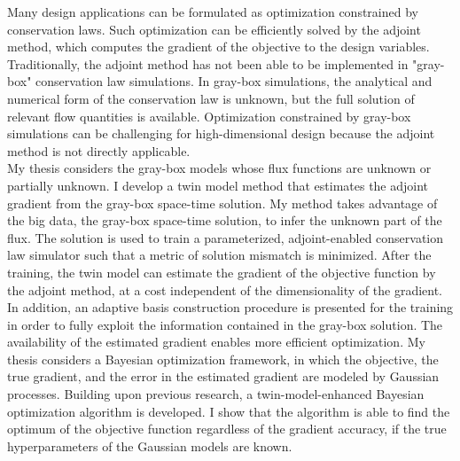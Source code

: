% 
% 
%


Many design applications can be formulated as optimization constrained by conservation laws. Such optimization can be efficiently solved by the adjoint method, which computes the gradient of the objective to the design variables. Traditionally, the adjoint method has not been able to be implemented in "gray-box" conservation law simulations. In gray-box simulations, the analytical and numerical form of the conservation law is unknown, but the full solution of relevant flow quantities is available. Optimization constrained by gray-box simulations can be challenging for high-dimensional design because the adjoint method is not directly applicable.\\


My thesis considers the gray-box models whose flux functions are unknown or partially unknown. 
I develop a twin model method that estimates the adjoint gradient from the gray-box space-time
solution. My method takes advantage of the big data, the gray-box space-time solution, to
infer the unknown part of the flux.
The solution is used to train a parameterized, adjoint-enabled conservation law simulator such that
a metric of solution mismatch is minimized.
After the training,
the twin model can estimate the gradient of the objective function by the adjoint method,
at a cost independent of the dimensionality of the gradient. 
In addition, an adaptive basis construction
procedure is presented for the training in order to fully exploit the information contained in the 
gray-box solution.
The availability of the estimated gradient enables more efficient optimization. My thesis 
considers a Bayesian optimization framework, in which 
the objective, the true gradient, and the error in the estimated gradient are 
modeled by Gaussian processes. 
Building upon previous research, a twin-model-enhanced Bayesian optimization algorithm 
is developed. I show that
the algorithm is able to find the optimum of the objective function
regardless of the gradient accuracy, if the 
true hyperparameters of the Gaussian models are known.\\

